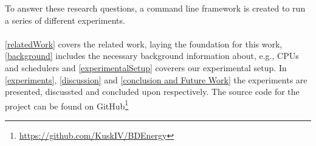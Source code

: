 

To answer these research questions, a command line framework is created to run a series of different experiments.

\paragraph{}
\cref{relatedWork} covers the related work, laying the foundation for this work, \cref{background}  includes the necessary background information about, e.g., CPUs and schedulers and \cref{experimentalSetup} coverers our experimental setup. %
In \cref{experiments}, \cref{discussion} and \cref{conclusion and Future Work} the experiments are presented, discussted and concluded upon respectively. The source code for the project can be found on GitHub\footnote{\url{https://github.com/KuskIV/BDEnergy}}


